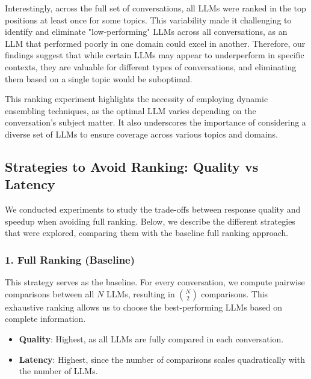 \documentclass[sigconf,authordraft]{acmart}
\begin{document}
Interestingly, across the full set of conversations, all LLMs were ranked in the top positions at least once for some topics. This variability made it challenging to identify and eliminate "low-performing" LLMs across all conversations, as an LLM that performed poorly in one domain could excel in another. Therefore, our findings suggest that while certain LLMs may appear to underperform in specific contexts, they are valuable for different types of conversations, and eliminating them based on a single topic would be suboptimal.

This ranking experiment highlights the necessity of employing dynamic ensembling techniques, as the optimal LLM varies depending on the conversation's subject matter. It also underscores the importance of considering a diverse set of LLMs to ensure coverage across various topics and domains.

\subsection{Strategies to Avoid Ranking: Quality vs Latency}

We conducted experiments to study the trade-offs between response quality and speedup when avoiding full ranking. Below, we describe the different strategies that were explored, comparing them with the baseline full ranking approach.

\subsubsection{1. Full Ranking (Baseline)}
This strategy serves as the baseline. For every conversation, we compute pairwise comparisons between all \( N \) LLMs, resulting in \( \binom{N}{2} \) comparisons. This exhaustive ranking allows us to choose the best-performing LLMs based on complete information.

\begin{itemize}
    \item \textbf{Quality}: Highest, as all LLMs are fully compared in each conversation.
    \item \textbf{Latency}: Highest, since the number of comparisons scales quadratically with the number of LLMs.
\end{itemize}
\end{document}
